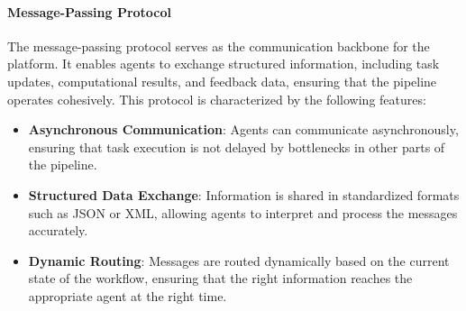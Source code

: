 \documentclass[12pt]{article}
\begin{document}
\paragraph{Message-Passing Protocol}
The message-passing protocol serves as the communication backbone for the platform. It enables agents to exchange structured information, including task updates, computational results, and feedback data, ensuring that the pipeline operates cohesively. This protocol is characterized by the following features:
\begin{itemize}
    \item \textbf{Asynchronous Communication}: Agents can communicate asynchronously, ensuring that task execution is not delayed by bottlenecks in other parts of the pipeline.
    \item \textbf{Structured Data Exchange}: Information is shared in standardized formats such as JSON or XML, allowing agents to interpret and process the messages accurately.
    \item \textbf{Dynamic Routing}: Messages are routed dynamically based on the current state of the workflow, ensuring that the right information reaches the appropriate agent at the right time.
\end{itemize}
\end{document}
